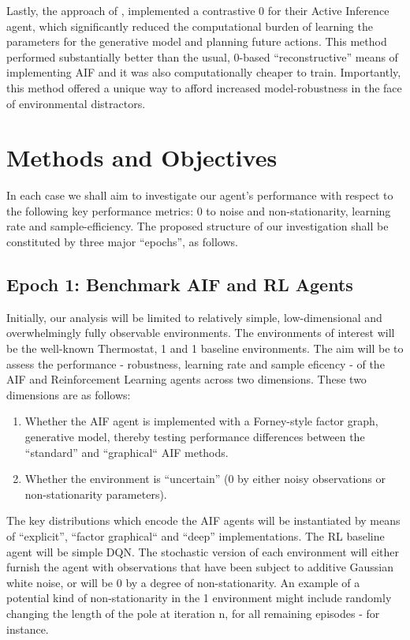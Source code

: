 \documentclass[12pt, twoside]{report}
\begin{document}
Lastly, the approach of \textcite{Contrastive-AIF}, implemented a contrastive 0 for their Active Inference agent, which significantly reduced the computational burden of learning the parameters for the generative model and planning future actions. This method performed substantially better than the usual, 0-based ``reconstructive'' means of implementing AIF and it was also computationally cheaper to train. Importantly, this method offered a unique way to afford increased model-robustness in the face of environmental distractors. 


\section{Methods and Objectives}
In each case we shall aim to investigate our agent's performance with respect to the following key performance metrics: 0 to noise and non-stationarity, learning rate and sample-efficiency.
The proposed structure of our investigation shall be constituted by three major ``epochs'', as follows. 

\subsection{Epoch 1: Benchmark AIF and RL Agents}
Initially, our analysis will be limited to relatively simple, low-dimensional and overwhelmingly fully observable environments. The environments of interest will be the well-known Thermostat, 1 and 1 baseline environments. The aim will be to assess the performance - robustness, learning rate and sample eficency - of the AIF and Reinforcement Learning agents across two dimensions. These two dimensions are as follows:
\begin{enumerate}
\item Whether the AIF agent is implemented with a Forney-style factor graph, generative model, thereby testing performance differences between the ``standard'' and ``graphical`` AIF methods.
\item Whether the environment is ``uncertain'' (0 by either noisy observations or non-stationarity parameters).
\end{enumerate}

The key distributions which encode the AIF agents will be instantiated by means of ``explicit'', ``factor graphical`` and ``deep'' implementations. The RL baseline agent will be simple DQN. The stochastic version of each environment will either furnish the agent with observations that have been subject to additive Gaussian white noise, or will be 0 by a degree of non-stationarity. An example of a potential kind of non-stationarity in the 1 environment might include randomly changing the length of the pole at iteration n, for all remaining episodes - for instance.  
\end{document}
